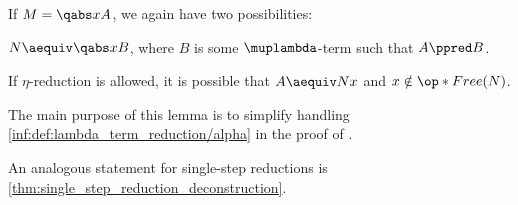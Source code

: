\begin{lemma}
\begin{thmenum}
     If \( M = \qabs x A \), we again have two possibilities:
    \begin{thmenum}
       \( N \aequiv \qabs x B \), where \( B \) is some \( \muplambda \)-term such that \( A \ppred B \).

       If \( \eta \)-reduction is allowed, it is possible that \( A \aequiv Nx \) and \( x \notin \op*{Free}(N) \).
    \end{thmenum}
  \end{thmenum}
\end{lemma}
\begin{comments}
  \item The main purpose of this lemma is to simplify handling \ref{inf:def:lambda_term_reduction/alpha} in the proof of .

  \item An analogous statement for single-step reductions is \cref{thm:single_step_reduction_deconstruction}.
\end{comments}
